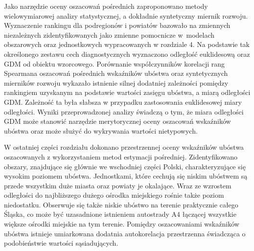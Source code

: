 Jako narzędzie oceny oszacowań pośrednich zaproponowano metody wielowymiarowej analizy statystycznej, a dokładnie syntetyczny miernik rozwoju. Wyznaczenie rankingu dla podregionów i powiatów bazowało na zmiennych niezależnych zidentyfikowanych jako zmienne pomocnicze w~modelach obszarowych oraz jednostkowych wypracowanych w rozdziale 4. Na podstawie tak określonego zestawu cech diagnostycznych wyznaczono odległość euklidesową oraz GDM od obiektu wzorcowego. Porównanie współczynników korelacji rang Spearmana oszacowań pośrednich wskaźników ubóstwa oraz syntetycznych mierników rozwoju wykazało istnienie silnej dodatniej zależności pomiędzy rankingiem uzyskanym na podstawie wartości zasięgu ubóstwa, a miarą odległości GDM. Zależność ta była słabsza w przypadku zastosowania euklidesowej miary odległości. Wyniki przeprowadzonej analizy świadczą o tym, że miara odległości GDM może stanowić narzędzie merytorycznej oceny oszacowań wskaźników ubóstwa oraz może służyć do wykrywania wartości nietypowych.

W ostatniej części rozdziału dokonano przestrzennej oceny wskaźników ubóstwa oszacowanych z wykorzystaniem metod estymacji pośredniej. Zidentyfikowano obszary, znajdujące się głównie we wschodniej części Polski, charakteryzujące się wysokim poziomem ubóstwa. Jednostkami, które cechują się niskim ubóstwem są przede wszystkim duże miasta oraz powiaty je okalające. Wraz ze wzrostem odległości do najbliższego dużego ośrodka miejskiego rośnie także poziom niedostatku. Obserwuje się także niskie ubóstwo na terenie praktycznie całego Śląska, co może być uzasadnione istnieniem autostrady A4 łączącej wszystkie większe ośrodki miejskie na tym terenie. Pomiędzy oszacowaniami wskaźników ubóstwa istnieje umiarkowana dodatnia autokorelacja przestrzenna świadcząca o podobieństwie wartości sąsiadujących.